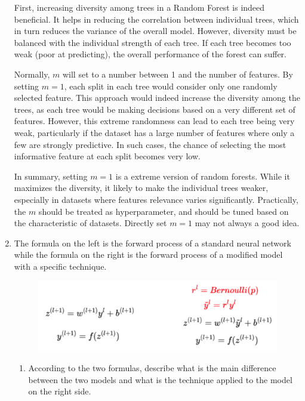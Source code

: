 \documentclass[twocolumn]{extarticle}
\begin{document}
\begin{enumerate}
	First, increasing diversity among trees in a Random Forest is indeed beneficial. It helps in reducing the correlation between individual trees, which in turn reduces the variance of the overall model. However, diversity must be balanced with the individual strength of each tree. If each tree becomes too weak (poor at predicting), the overall performance of the forest can suffer.
	
	Normally, $m$ will set to a number between 1 and the number of features. By setting $m=1$, each split in each tree would consider only one randomly selected feature. This approach would indeed increase the diversity among the trees, as each tree would be making decisions based on a very different set of features. However, this extreme randomness can lead to each tree being very weak, particularly if the dataset has a large number of features where only a few are strongly predictive. In such cases, the chance of selecting the most informative feature at each split becomes very low.
	
	In summary, setting $m=1$ is a extreme version of random forests. While it maximizes the diversity, it likely to make the individual trees weaker, especially in datasets where features relevance varies significantly. Practically, the $m$ should be treated as hyperparameter, and should be tuned based on the characteristic of datasets. Directly set $m=1$ may not always a good idea. 
	
	
	\item The formula on the left is the forward process of a standard neural network while the formula on the right is the forward process of a modified model with a specific technique.
	\begin{figure}[H]
	\centering
	\includegraphics[width=0.95\linewidth]{report_q}
	\caption{}
	\label{fig:reportq}
	\end{figure}
	
	\begin{enumerate}[label=\alph*.]
		\item According to the two formulas, describe what is the main difference between the two models and what is the technique applied to the model on the right side.
		

\end{enumerate}
\end{enumerate}
\end{document}

